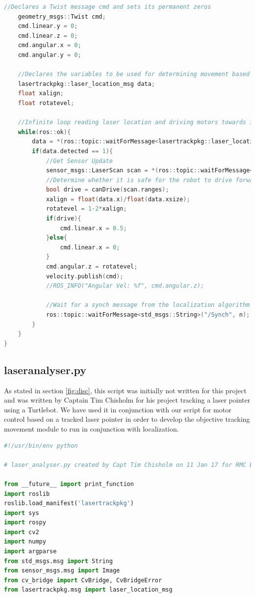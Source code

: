 \documentclass{article}
\newcommand\tab[1][0.5cm]{\hspace*{#1}}
\begin{document}
\begin{appendices}
\begin{lstlisting}[language=C++]
	//Declares a Twist message cmd and sets its permanent zeros
	geometry_msgs::Twist cmd;
	cmd.linear.y = 0;
	cmd.linear.z = 0;
	cmd.angular.x = 0;
	cmd.angular.y = 0;

	//Declares the variables to be used for determining movement based on laser location
	lasertrackpkg::laser_location_msg data;
	float xalign;
	float rotatevel;

	//Infinite loop reading laser location and driving motors towards it
	while(ros::ok){
		data = *(ros::topic::waitForMessage<lasertrackpkg::laser_location_msg>("/lasertrackpkg/laser_location", n));
		if(data.detected == 1){
			//Get Sensor Update
			sensor_msgs::LaserScan scan = *(ros::topic::waitForMessage<sensor_msgs::LaserScan>("/scan", n));
			//Determine whether it is safe for the robot to drive forward
			bool drive = canDrive(scan.ranges);
			xalign = float(data.x)/float(data.xsize);
			rotatevel = 1-2*xalign;
			if(drive){
				cmd.linear.x = 0.5;
			}else{
				cmd.linear.x = 0;
			}
			cmd.angular.z = rotatevel;
			velocity.publish(cmd);
			//ROS_INFO("Angular Vel: %f", cmd.angular.z);

			//Wait for a synch message from the localization algorithm declaring it is finished the movement update
			ros::topic::waitForMessage<std_msgs::String>("/Synch", n);
		}
	}
}

\end{lstlisting}

\subsection{laser\textunderscore analyser.py}
\tab As stated in section \ref{fig:disc}, this script was initially not written for this project and was written by Captain Tim Chisholm for his project tracking a laser pointer using a Turtlebot\citep{Tracker}. We have used it in conjunction with our script for motor control based on a tracked laser pointer in order to develop the objective tracking movement module to run in conjunction with localization.
\begin{lstlisting}[language=Python]
#!/usr/bin/env python

# laser_analyser.py created by Capt Tim Chisholm on 11 Jan 17 for RMC EE503

from __future__ import print_function
import roslib
roslib.load_manifest('lasertrackpkg')
import sys
import rospy
import cv2
import numpy
import argparse
from std_msgs.msg import String
from sensor_msgs.msg import Image
from cv_bridge import CvBridge, CvBridgeError
from lasertrackpkg.msg import laser_location_msg


\end{lstlisting}
\end{appendices}
\end{document}
